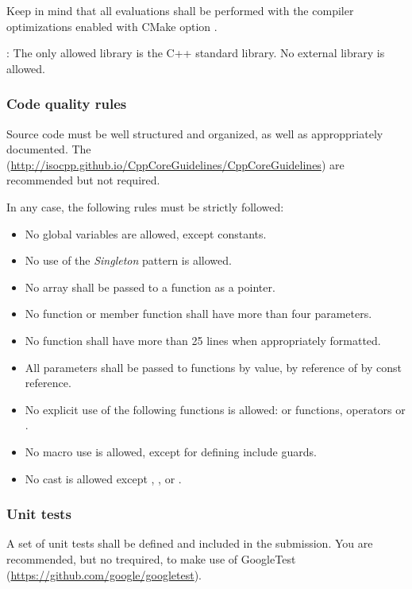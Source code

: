 Keep in mind that all evaluations shall be performed with the compiler optimizations
enabled with CMake option
.


: 
The only allowed library is the C++ standard library.
No external library is allowed.

\subsubsection{Code quality rules}

Source code must be well structured and organized, 
as well as approppriately documented.
The 
(\url{http://isocpp.github.io/CppCoreGuidelines/CppCoreGuidelines})
are recommended but not required.

In any case, the following rules must be strictly followed:

\begin{itemize}
  \item No global variables are allowed, except constants.
  \item No use of the \emph{Singleton} pattern is allowed.
  \item No array shall be passed to a function as a pointer.
  \item No function or member function shall have more than four parameters.
  \item No function shall have more than 25 lines when appropriately formatted.
  \item All parameters shall be passed to functions by value,
        by reference of by const reference.
  \item No explicit use of the following functions is allowed:
         or  functions,
        operators  or .
  \item No macro use is allowed, except for defining include guards.
  \item No cast is allowed except 
        , , 
         or .
\end{itemize}


\subsubsection{Unit tests}

A set of unit tests shall be defined and included in the submission.
You are recommended, but no trequired, to make use of GoogleTest
(\url{https://github.com/google/googletest}).

